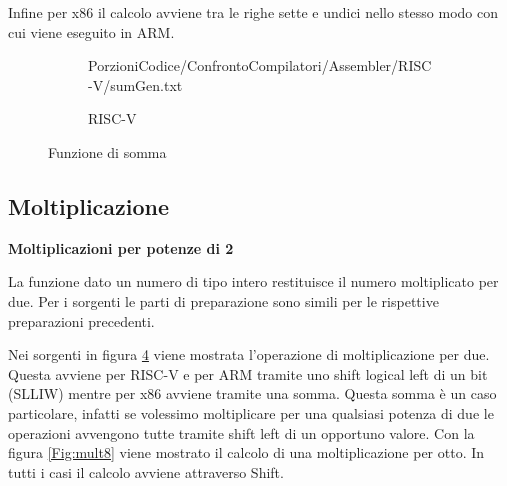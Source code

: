 \documentclass[12pt, a4paper]{report}
\begin{document}
Infine per x86 il calcolo avviene tra le righe sette e undici nello stesso modo con cui viene eseguito in ARM.

\begin{figure}[ht]
 
 \begin{subfigure}[b]{0.3\textwidth}
 
  {PorzioniCodice/ConfrontoCompilatori/Assembler/RISC-V/sumGen.txt}
	\label{Code:Add2RISC}
\caption{RISC-V}
 \end{subfigure}
 \hfill
 \begin{subfigure}[b]{0.3\textwidth}
 
 
 \label{Code:Add2ARM}

 \end{subfigure}
 \hfill
 \begin{subfigure}[b]{0.3\textwidth}
 
 
	 
	\label{Code:Add2X86}
 \end{subfigure}
 
 \caption{Funzione di somma}
 \label{Fig:code2}
\end{figure}



\subsection{Moltiplicazione}

\vspace{0.3 cm}
\textbf{Moltiplicazioni per potenze di 2}



La funzione dato un numero di tipo intero restituisce il numero moltiplicato per due. Per i sorgenti le parti di preparazione sono simili per le rispettive preparazioni precedenti.


\vspace{0.3 cm}
Nei sorgenti in figura \ref{Fig:code2} viene mostrata l'operazione di moltiplicazione per due. Questa avviene per RISC-V e per ARM tramite uno shift logical left di un bit (SLLIW) mentre per x86 avviene tramite una somma. Questa somma è un caso particolare, infatti se volessimo moltiplicare per una qualsiasi potenza di due le operazioni avvengono tutte tramite shift left di un opportuno valore. Con la figura \ref{Fig:mult8} viene mostrato il calcolo di una moltiplicazione per otto. In tutti i casi il calcolo avviene attraverso Shift.
\end{document}
